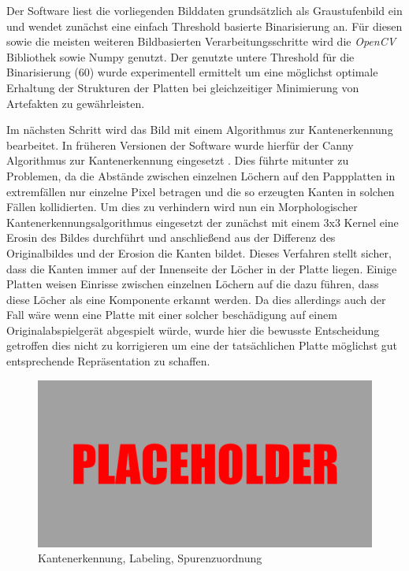 Der Software liest die vorliegenden Bilddaten grundsätzlich als Graustufenbild ein und wendet zunächst eine einfach Threshold basierte Binarisierung an.
Für diesen sowie die meisten weiteren Bildbasierten Verarbeitungsschritte wird die \textit{OpenCV} \parencite[]{opencv_library} Bibliothek sowie Numpy \parencite[]{harris2020array} genutzt.
Der genutzte untere Threshold für die Binarisierung (60) wurde experimentell ermittelt um eine möglichst optimale Erhaltung der Strukturen der Platten bei gleichzeitiger Minimierung von Artefakten zu gewährleisten.

Im nächsten Schritt wird das Bild mit einem Algorithmus zur Kantenerkennung bearbeitet.
In früheren Versionen der Software wurde hierfür der Canny Algorithmus zur Kantenerkennung eingesetzt \parencite[]{canny_1986}.
Dies führte mitunter zu Problemen, da die Abstände zwischen einzelnen Löchern auf den Pappplatten in extremfällen nur einzelne Pixel betragen und die so erzeugten Kanten in solchen Fällen kollidierten.
Um dies zu verhindern wird nun ein Morphologischer Kantenerkennungsalgorithmus eingesetzt der zunächst mit einem 3x3 Kernel eine Erosin des Bildes durchführt und anschließend aus der Differenz des Originalbildes und der Erosion die Kanten bildet.
Dieses Verfahren stellt sicher, dass die Kanten immer auf der Innenseite der Löcher in der Platte liegen.
Einige Platten weisen Einrisse zwischen einzelnen Löchern auf die dazu führen, dass diese Löcher als eine Komponente erkannt werden.
Da dies allerdings auch der Fall wäre wenn eine Platte mit einer solcher beschädigung auf einem Originalabspielgerät abgespielt würde, wurde hier die bewusste Entscheidung getroffen dies nicht zu korrigieren um eine der tatsächlichen Platte möglichst gut entsprechende Repräsentation zu schaffen. 

\begin{figure}[t]
    \centering
    \includegraphics[width=\textwidth]{graphics/placeholder.png}
    \caption{Kantenerkennung, Labeling, Spurenzuordnung}
    \label{pipelinesteps}
\end{figure}

